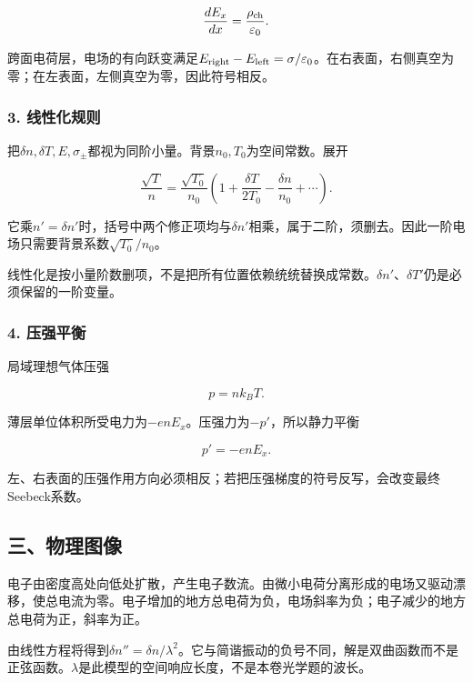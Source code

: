 \documentclass[12pt,a4paper,fontset=fandol]{ctexart}
\begin{document}
\[
\frac{dE_x}{dx}=\frac{\rho_{\rm ch}}{\varepsilon_0}.
\]

跨面电荷层，电场的有向跃变满足\(E_{\rm right}-E_{\rm left}=\sigma/\varepsilon_0\)。在右表面，右侧真空为零；在左表面，左侧真空为零，因此符号相反。

\subsubsection{3. 线性化规则}\label{ux7ebfux6027ux5316ux89c4ux5219}

把\(\delta n,\delta T,E,\sigma_\pm\)都视为同阶小量。背景\(n_0,T_0\)为空间常数。展开

\[
\frac{\sqrt T}{n}
=\frac{\sqrt{T_0}}{n_0}
\left(1+\frac{\delta T}{2T_0}
-\frac{\delta n}{n_0}+\cdots\right).
\]

它乘\(n'=\delta n'\)时，括号中两个修正项均与\(\delta n'\)相乘，属于二阶，须删去。因此一阶电场只需要背景系数\(\sqrt{T_0}/n_0\)。

线性化是按小量阶数删项，不是把所有位置依赖统统替换成常数。\(\delta n'\)、\(\delta T'\)仍是必须保留的一阶变量。

\subsubsection{4. 压强平衡}\label{ux538bux5f3aux5e73ux8861}

局域理想气体压强

\[
p=nk_BT.
\]

薄层单位体积所受电力为\(-enE_x\)。压强力为\(-p'\)，所以静力平衡

\[
p'=-enE_x.
\]

左、右表面的压强作用方向必须相反；若把压强梯度的符号反写，会改变最终Seebeck系数。

\subsection{三、物理图像}\label{ux4e09ux7269ux7406ux56feux50cf-5}

电子由密度高处向低处扩散，产生电子数流。由微小电荷分离形成的电场又驱动漂移，使总电流为零。电子增加的地方总电荷为负，电场斜率为负；电子减少的地方总电荷为正，斜率为正。

由线性方程将得到\(\delta n''=\delta n/\lambda^2\)。它与简谐振动的负号不同，解是双曲函数而不是正弦函数。\(\lambda\)是此模型的空间响应长度，不是本卷光学题的波长。
\end{document}
